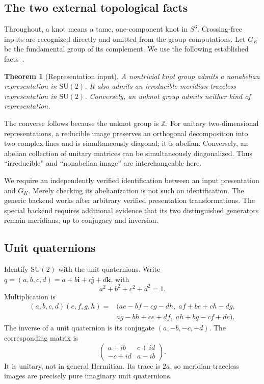 \documentclass[11pt]{article}
\newtheorem{theorem}{Theorem}[section]
\theoremstyle{definition}
\theoremstyle{remark}
\newcommand{\SU}{\mathrm{SU}(2)}
\newcommand{\ZZ}{\mathbb Z}
\begin{document}
\subsection{The two external topological facts}
Throughout, a knot means a tame, one-component knot in $S^3$. Crossing-free inputs are recognized directly and omitted from the group computations. Let $G_K$ be the fundamental group of its complement. We use the following established facts~\cite{km,xz}.
\begin{theorem}[Representation input]
\label{thm:external}
A nontrivial knot group admits a nonabelian representation in $\SU$. It also admits an irreducible meridian-traceless representation in $\SU$. Conversely, an unknot group admits neither kind of representation.
\end{theorem}
The converse follows because the unknot group is $\ZZ$. For unitary two-dimensional representations, a reducible image preserves an orthogonal decomposition into two complex lines and is simultaneously diagonal; it is abelian. Conversely, an abelian collection of unitary matrices can be simultaneously diagonalized. Thus ``irreducible'' and ``nonabelian image'' are interchangeable here.

We require an independently verified identification between an input presentation and $G_K$. Merely checking its abelianization is not such an identification. The generic backend works after arbitrary verified presentation transformations. The special backend requires additional evidence that its two distinguished generators remain meridians, up to conjugacy and inversion.

\subsection{Unit quaternions}
Identify $\SU$ with the unit quaternions. Write $q=(a,b,c,d)=a+b\mathbf i+c\mathbf j+d\mathbf k$, with
\[
 a^2+b^2+c^2+d^2=1.
\]
Multiplication is
\begin{align*}
(a,b,c,d)(e,f,g,h)={}&(ae-bf-cg-dh,\;af+be+ch-dg,\\
&ag-bh+ce+df,\;ah+bg-cf+de).
\end{align*}
The inverse of a unit quaternion is its conjugate $(a,-b,-c,-d)$. The corresponding matrix is
\[
\begin{pmatrix}a+ib&c+id\\-c+id&a-ib\end{pmatrix}.
\]
It is unitary, not in general Hermitian. Its trace is $2a$, so meridian-traceless images are precisely pure imaginary unit quaternions.
\end{document}
